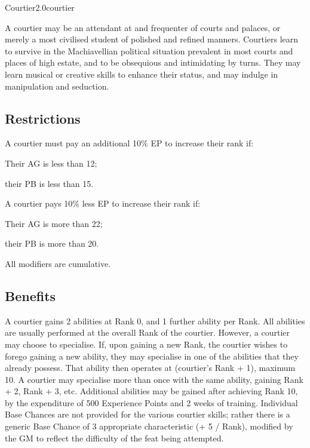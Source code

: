 \begin{skill}{Courtier}{2.0}{courtier}

A courtier may be an attendant at and frequenter of courts and
palaces, or merely a most civilised student of polished and refined
manners. Courtiers learn to survive in the Machiavellian political
situation prevalent in most courts and places of high estate, and to
be obsequious and intimidating by turns. They may learn musical or
creative skills to enhance their status, and may indulge in
manipulation and seduction.

\subsection{Restrictions}

A courtier must pay an additional 10\% EP to increase their rank if:
\begin{Itemize}
\item Their AG is less than 12;
\item their PB is less than 15.
\end{Itemize}
A courtier pays 10\% less EP to increase their rank if:
\begin{Itemize}
\item Their AG is more than 22;
\item their PB is more than 20.
\end{Itemize}
All modifiers are cumulative.

\subsection{Benefits}

A courtier gains 2 abilities at Rank 0, and 1 further ability per
Rank. All abilities are usually performed at the overall Rank of the
courtier.  However, a courtier may choose to specialise. If, upon
gaining a new Rank, the courtier wishes to forego gaining a new
ability, they may specialise in one of the abilities that they already
possess.  That ability then operates at (courtier's Rank + 1), maximum
10. A courtier may specialise more than once with the same ability,
gaining Rank + 2, Rank + 3, etc. Additional abilities may be gained
after achieving Rank 10, by the expenditure of 500 Experience Points
and 2 weeks of training. Individual Base Chances are not provided for
the various courtier skills; rather there is a generic Base Chance of
3 \x appropriate characteristic (+ 5 / Rank), modified by the GM to
reflect the difficulty of the feat being attempted.


\end{skill}
